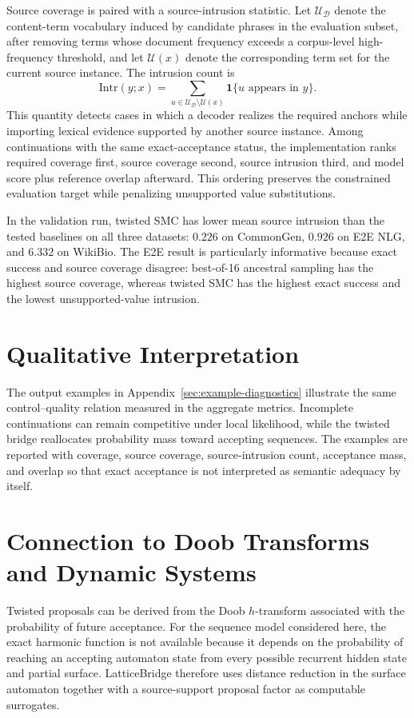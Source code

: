 \documentclass[11pt]{article}
\begin{document}
Source coverage is paired with a source-intrusion statistic. Let $\mathcal{U}_{\mathcal{D}}$ denote the content-term vocabulary induced by candidate phrases in the evaluation subset, after removing terms whose document frequency exceeds a corpus-level high-frequency threshold, and let $\mathcal{U}(x)$ denote the corresponding term set for the current source instance. The intrusion count is
\[
\mathrm{Intr}(y;x)
=
\sum_{u \in \mathcal{U}_{\mathcal{D}}\setminus \mathcal{U}(x)}
\mathbf{1}\{u \text{ appears in } y\}.
\]
This quantity detects cases in which a decoder realizes the required anchors while importing lexical evidence supported by another source instance. Among continuations with the same exact-acceptance status, the implementation ranks required coverage first, source coverage second, source intrusion third, and model score plus reference overlap afterward. This ordering preserves the constrained evaluation target while penalizing unsupported value substitutions.

In the validation run, twisted SMC has lower mean source intrusion than the tested baselines on all three datasets: $0.226$ on CommonGen, $0.926$ on E2E NLG, and $6.332$ on WikiBio. The E2E result is particularly informative because exact success and source coverage disagree: best-of-16 ancestral sampling has the highest source coverage, whereas twisted SMC has the highest exact success and the lowest unsupported-value intrusion.

\section{Qualitative Interpretation}
The output examples in Appendix~\ref{sec:example-diagnostics} illustrate the same control--quality relation measured in the aggregate metrics. Incomplete continuations can remain competitive under local likelihood, while the twisted bridge reallocates probability mass toward accepting sequences. The examples are reported with coverage, source coverage, source-intrusion count, acceptance mass, and overlap so that exact acceptance is not interpreted as semantic adequacy by itself.

\section{Connection to Doob Transforms and Dynamic Systems}
Twisted proposals can be derived from the Doob $h$-transform associated with the probability of future acceptance. For the sequence model considered here, the exact harmonic function is not available because it depends on the probability of reaching an accepting automaton state from every possible recurrent hidden state and partial surface. LatticeBridge therefore uses distance reduction in the surface automaton together with a source-support proposal factor as computable surrogates.
\end{document}
